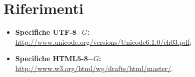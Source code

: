 \section{Riferimenti}
\begin{itemize}
	\item \textbf{Specifiche UTF-8$-G$:} \href{http://www.unicode.org/versions/Unicode6.1.0/ch03.pdf}{http://www.unicode.org/versions/Unicode6.1.0/ch03.pdf};
	\item \textbf{Specifiche HTML5-8$-G$:} \href{http://www.w3.org/html/wg/drafts/html/master/}{http://www.w3.org/html/wg/drafts/html/master/}.
\end{itemize}
